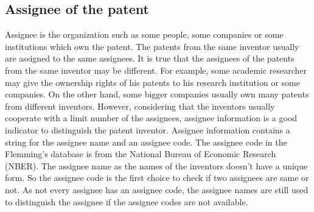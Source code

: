 

\subsection{Assignee of the patent}
Assignee is the organization such as some people, some companies or some institutions which own the patent. The patents from the same inventor usually are assigned to the same assignees. It is true that the assignees of the patents from the same inventor may be different. For example, some academic researcher may give the ownership rights of his patents to his research institution or some companies. On the other hand, some bigger companies usually own many patents from different inventors. However, considering that the inventors usually cooperate with a limit number of the assignees, assignee information is a good indicator to distinguish the patent inventor. Assignee information contains a string for the assignee name and an assignee code. The assignee code in the Flemming's database is from the National Bureau of Economic Research (NBER). The assignee name as the names of the inventors doesn't have a unique form. So the assignee code is the first choice to check if two assignees are same or not. As not every assignee has an assignee code, the assignee names are still used to distinguish the assignee if the assignee codes are not available.  


